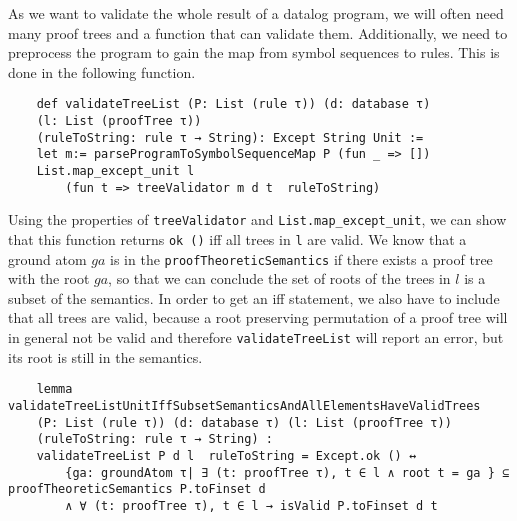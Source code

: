 As we want to validate the whole result of a datalog program, we will often need many proof trees and a function that can validate them. Additionally, we need to preprocess the program to gain the map from symbol sequences to rules. This is done in the following function.

\begin{lstlisting}
    def validateTreeList (P: List (rule τ)) (d: database τ) 
    (l: List (proofTree τ)) 
    (ruleToString: rule τ → String): Except String Unit :=
    let m:= parseProgramToSymbolSequenceMap P (fun _ => [])
    List.map_except_unit l 
        (fun t => treeValidator m d t  ruleToString)

\end{lstlisting}

Using the properties of \texttt{treeValidator} and \texttt{List.map\_except\_unit}, we can show that this function returns \texttt{ok ()} iff all trees in \texttt{l} are valid. We know that a ground atom $ga$ is in the \texttt{proofTheoreticSemantics} if there exists a proof tree with the root $ga$, so that we can conclude the set of roots of the trees in $l$ is a subset of the semantics. In order to get an iff statement, we also have to include that all trees are valid, because a root preserving permutation of a proof tree will in general not be valid and therefore \texttt{validateTreeList} will report an error, but its root is still in the semantics.

\begin{lstlisting}
    lemma validateTreeListUnitIffSubsetSemanticsAndAllElementsHaveValidTrees 
    (P: List (rule τ)) (d: database τ) (l: List (proofTree τ)) 
    (ruleToString: rule τ → String) : 
    validateTreeList P d l  ruleToString = Except.ok () ↔ 
        {ga: groundAtom τ| ∃ (t: proofTree τ), t ∈ l ∧ root t = ga } ⊆ proofTheoreticSemantics P.toFinset d 
        ∧ ∀ (t: proofTree τ), t ∈ l → isValid P.toFinset d t
\end{lstlisting}

